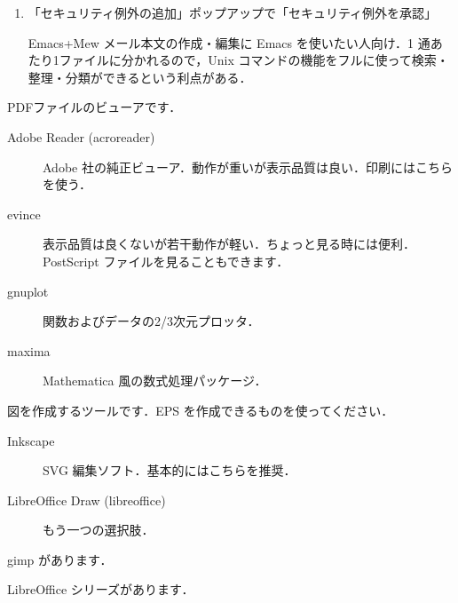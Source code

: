 \documentclass[main]{subfiles}
\begin{document}
\begin{description}[itemsep=0.8em]
\begin{description}
\begin{enumerate}
            \item 「セキュリティ例外の追加」ポップアップで「セキュリティ例外を承認」
        \item [Emacs+Mew] メール本文の作成・編集に Emacs を使いたい人向け．1 通あたり1ファイルに分かれるので，Unix コマンドの機能をフルに使って検索・整理・分類ができるという利点がある．
        \end{enumerate}
    \end{description}
    \item[PDF ビューア] PDFファイルのビューアです．    
    \begin{description}
        \item[Adobe Reader (acroreader)] Adobe 社の純正ビューア．動作が重いが表示品質は良い．印刷にはこちらを使う．
        \item[evince] 表示品質は良くないが若干動作が軽い．ちょっと見る時には便利．PostScript ファイルを見ることもできます．
    \end{description}
    \item[数学関連] 
    \begin{description}
        \item[gnuplot] 関数およびデータの2/3次元プロッタ．
        \item[maxima] Mathematica 風の数式処理パッケージ．
    \end{description}
    \item[ドローツール] 図を作成するツールです．EPS を作成できるものを使ってください．
    \begin{description}
        \item[Inkscape] SVG 編集ソフト．基本的にはこちらを推奨．
        \item[LibreOffice Draw (libreoffice)] もう一つの選択肢．
    \end{description}
    \item[フォトレタッチツール] gimp があります．
    \item[オフィスアプリケーション] LibreOffice シリーズがあります．
\end{description}
\end{document}

